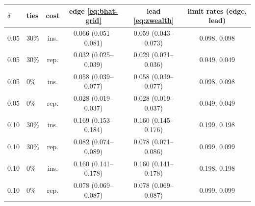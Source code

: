 \begin{tabular}{llcccc}
\toprule
$\delta$ & ties & cost & edge \eqref{eq:bhat-grid} & lead \eqref{eq:zwealth} & limit rates (edge, lead) \\
\midrule
0.05 & 30\% & ins. & 0.066 (0.051--0.081) & 0.059 (0.043--0.073) & 0.098, 0.098 \\
0.05 & 30\% & rep. & 0.032 (0.025--0.039) & 0.029 (0.021--0.036) & 0.049, 0.049 \\
0.05 & 0\% & ins. & 0.058 (0.039--0.077) & 0.058 (0.039--0.077) & 0.098, 0.098 \\
0.05 & 0\% & rep. & 0.028 (0.019--0.037) & 0.028 (0.019--0.037) & 0.049, 0.049 \\
0.10 & 30\% & ins. & 0.169 (0.153--0.184) & 0.160 (0.145--0.176) & 0.199, 0.198 \\
0.10 & 30\% & rep. & 0.082 (0.074--0.089) & 0.078 (0.071--0.086) & 0.099, 0.099 \\
0.10 & 0\% & ins. & 0.160 (0.141--0.178) & 0.160 (0.141--0.178) & 0.198, 0.198 \\
0.10 & 0\% & rep. & 0.078 (0.069--0.087) & 0.078 (0.069--0.087) & 0.099, 0.099 \\
\bottomrule
\end{tabular}